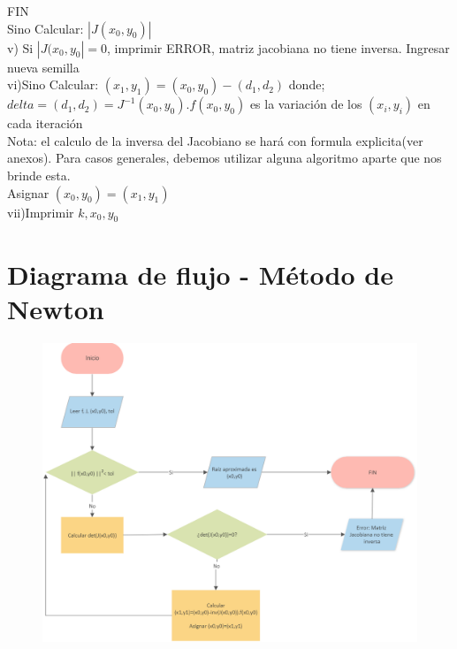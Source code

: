 \documentclass[10pt,a4paper]{article}
\begin{document}
\hspace{2cm} FIN \\

\hspace{1cm} Sino Calcular: $|J(x_{0},y_{0})|$\\

\hspace{1cm} v) Si $|J(x_{0},y_{0}|=0$, imprimir ERROR, matriz jacobiana no tiene inversa. Ingresar nueva semilla\\

\hspace{1cm} vi)Sino Calcular: $(x_{1},y_{1})=(x_{0},y_{0})-(d_{1},d_{2})$ donde;\\
 
\hspace{2cm}$delta=(d_{1},d_{2})=J^{-1}(x_{0},y_{0}).f(x_{0},y_{0})$ es la variación de los $(x_{i},y_{i})$ en cada iteración \\

Nota: el calculo de la inversa del Jacobiano se hará con formula explicita(ver anexos). Para casos generales, debemos utilizar alguna algoritmo aparte que nos brinde esta.\\

\hspace{2cm} Asignar $(x_{0},y_{0})=(x_{1},y_{1})$\\

\hspace{1cm} vii)Imprimir $k,x_{0},y_{0}$\\


\section{Diagrama de flujo - Método de Newton}

\begin{figure}[h]
\centering
\includegraphics[scale=0.66]{flujo1}
\caption{}
\end{figure}
\end{document}
